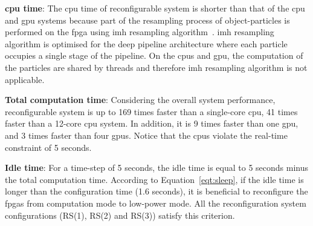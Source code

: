 \textbf{\gls{cpu} time}: The \gls{cpu} time of reconfigurable system is shorter than that of the \gls{cpu} and \gls{gpu} systems because part of the resampling process of object-particles is performed on the \gls{fpga} using \gls{imh} resampling algorithm~\cite{miao11}.
\gls{imh} resampling algorithm is optimised for the deep pipeline architecture where each particle occupies a single stage of the pipeline.
On the \glspl{cpu} and \gls{gpu}, the computation of the particles are shared by threads and therefore \gls{imh} resampling algorithm is not applicable.

\textbf{Total computation time}: Considering the overall system performance, reconfigurable system is up to 169 times faster than a single-core \gls{cpu}, 41 times faster than a 12-core \gls{cpu} system.
In addition, it is 9 times faster than one \gls{gpu}, and 3 times faster than four \gls{gpu}s.
Notice that the \glspl{cpu} violate the real-time constraint of 5 seconds.

\textbf{Idle time}: For a time-step of 5 seconds, the idle time is equal to 5 seconds minus the total computation time.
According to Equation~\ref{eqt:sleep}, if the idle time is longer than the configuration time (1.6 seconds), it is beneficial to reconfigure the \glspl{fpga} from computation mode to low-power mode.
All the reconfiguration system configurations (RS(1), RS(2) and RS(3)) satisfy this criterion.

